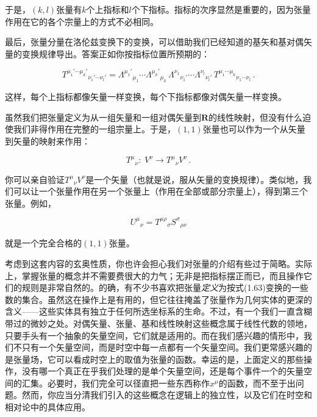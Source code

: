 于是，$(k,l)$张量有$k$个上指标和$l$个下指标。指标的次序显然是重要的，因为张量作用在它的各个宗量上的方式不必相同。

最后，张量分量在洛伦兹变换下的变换，可以借助我们已经知道的基矢和基对偶矢量的变换规律导出。答案正如你按指标位置所预期的：

\begin{equation*}
T^{\mu_1'\cdots\mu_k'}{}_{\nu_1'\cdots\nu_l'}
=\Lambda^{\mu_1'}{}_{\mu_1}\cdots\Lambda^{\mu_k'}{}_{\mu_k}\,
\Lambda^{\nu_1}{}_{\nu_1'}\cdots\Lambda^{\nu_l}{}_{\nu_l'}\,
T^{\mu_1\cdots\mu_k}{}_{\nu_1\cdots\nu_l}\,.
\tag{1.63}
\end{equation*}

这样，每个上指标都像矢量一样变换，每个下指标都像对偶矢量一样变换。

虽然我们把张量定义为从一组矢量和一组对偶矢量到$\mathbf{R}$的线性映射，但没有什么迫使我们非得作用在完整的一组宗量上。于是，$(1,1)$张量也可以作为一个从矢量到矢量的映射来作用：

\begin{equation*}
T^{\mu}{}_{\nu}:\;V^{\nu}\rightarrow T^{\mu}{}_{\nu}V^{\nu}\,.
\tag{1.64}
\end{equation*}

你可以亲自验证$T^{\mu}{}_{\nu}V^{\nu}$是一个矢量（也就是说，服从矢量的变换规律）。类似地，我们可以让一个张量作用在另一个张量上（作用在全部或部分宗量上），得到第三个张量。例如，

\begin{equation*}
U^{\mu}{}_{\nu}=T^{\mu\rho}{}_{\sigma}S^{\sigma}{}_{\rho\nu}
\tag{1.65}
\end{equation*}

就是一个完全合格的$(1,1)$张量。

考虑到这套内容的玄奥性质，你也许会担心我们对张量的介绍有些过于简略。实际上，掌握张量的概念并不需要费很大的力气；无非是把指标摆正而已，而且操作它们的规则是非常自然的。的确，有不少书喜欢把张量\emph{定义}为按式(1.63)变换的一些数的集合。虽然这在操作上是有用的，但它往往掩盖了张量作为几何实体的更深的含义——这些实体具有独立于任何所选坐标系的生命。不过，有一个我们一直含糊带过的微妙之处。对偶矢量、张量、基和线性映射这些概念属于线性代数的领地，只要手头有一个抽象的矢量空间，它们就是适用的。而在我们感兴趣的情形中，我们不只有一个矢量空间，而是时空中每一点都有一个矢量空间。我们更常感兴趣的是张量场，它可以看成时空上的取值为张量的函数。幸运的是，上面定义的那些操作，没有哪一个真正在乎我们处理的是单个矢量空间，还是每个事件一个的矢量空间的汇集。必要时，我们完全可以径直把一些东西称作$x^{\mu}$的函数，而不至于出问题。然而，你应当分清我们引入的这些概念在逻辑上的独立性，以及它们在时空和相对论中的具体应用。

